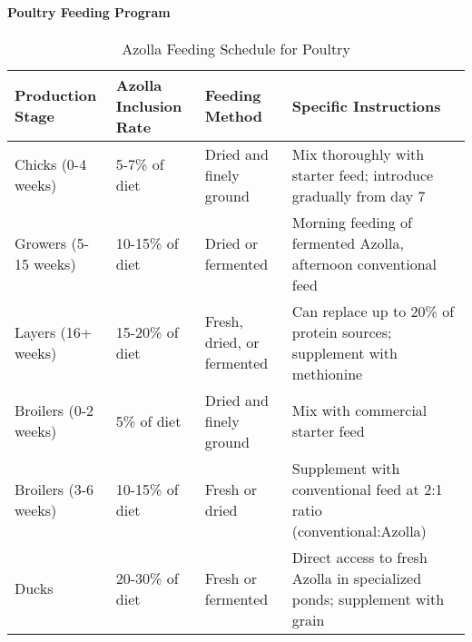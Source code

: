 \paragraph{Poultry Feeding Program}
\begin{table}[h]
\centering
\caption{Azolla Feeding Schedule for Poultry}
\label{tab:poultry_feeding}
\begin{tabular}{|p{4cm}|p{2.5cm}|p{2.5cm}|p{4.5cm}|}
\hline
\textbf{Production Stage} & \textbf{Azolla Inclusion Rate} & \textbf{Feeding Method} & \textbf{Specific Instructions} \\
\hline
Chicks (0-4 weeks) & 5-7\% of diet & Dried and finely ground & Mix thoroughly with starter feed; introduce gradually from day 7 \\
\hline
Growers (5-15 weeks) & 10-15\% of diet & Dried or fermented & Morning feeding of fermented Azolla, afternoon conventional feed \\
\hline
Layers (16+ weeks) & 15-20\% of diet & Fresh, dried, or fermented & Can replace up to 20\% of protein sources; supplement with methionine \\
\hline
Broilers (0-2 weeks) & 5\% of diet & Dried and finely ground & Mix with commercial starter feed \\
\hline
Broilers (3-6 weeks) & 10-15\% of diet & Fresh or dried & Supplement with conventional feed at 2:1 ratio (conventional:Azolla) \\
\hline
Ducks & 20-30\% of diet & Fresh or fermented & Direct access to fresh Azolla in specialized ponds; supplement with grain \\
\hline
\end{tabular}
\end{table}

